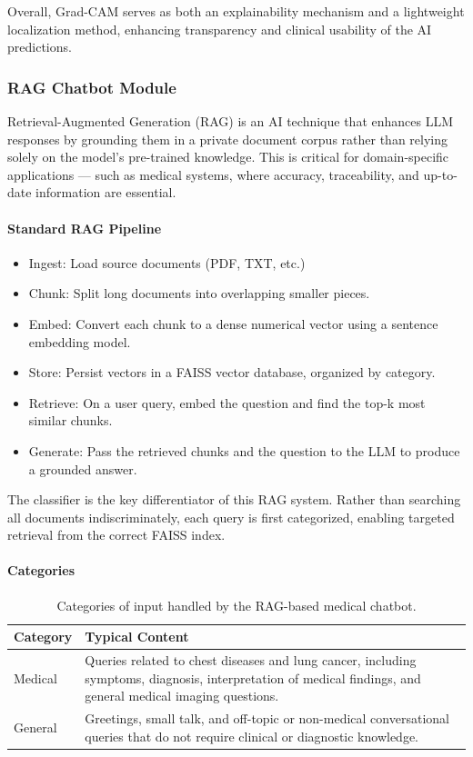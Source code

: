Overall, Grad-CAM serves as both an explainability mechanism and a lightweight localization method, enhancing transparency and clinical usability of the AI predictions.

\subsubsection{RAG Chatbot Module}
Retrieval-Augmented Generation (RAG) is an AI technique that enhances LLM responses by grounding them in a private document corpus rather than relying solely on the model's pre-trained knowledge. This is critical for domain-specific applications — such as medical systems,  where accuracy, traceability, and up-to-date information are essential.

\paragraph{Standard RAG Pipeline}
\begin{itemize}
	\item Ingest:  Load source documents (PDF, TXT, etc.)
	\item Chunk: Split long documents into overlapping smaller pieces.
	\item Embed: Convert each chunk to a dense numerical vector using a sentence embedding model.
	\item Store: Persist vectors in a FAISS vector database, organized by category.
	\item Retrieve: On a user query, embed the question and find the top-k most similar chunks.
	\item Generate: Pass the retrieved chunks and the question to the LLM to produce a grounded answer.
\end{itemize}

The classifier is the key differentiator of this RAG system. Rather than searching all documents indiscriminately, each query is first categorized, enabling targeted retrieval from the correct FAISS index.

\paragraph{Categories}
\begin{table}[htbp]
	\centering
	\caption{Categories of input handled by the RAG-based medical chatbot.}
	\label{tab:rag_input_categories}
	\begin{tabular}{|p{4cm}|p{9cm}|}
		\hline
		\textbf{Category} & \textbf{Typical Content} \\
		\hline
		
		Medical &
		Queries related to chest diseases and lung cancer, including symptoms, diagnosis, interpretation of medical findings, and general medical imaging questions. \\
		\hline
		
		General &
		Greetings, small talk, and off-topic or non-medical conversational queries that do not require clinical or diagnostic knowledge. \\
		\hline
		
	\end{tabular}
\end{table}

